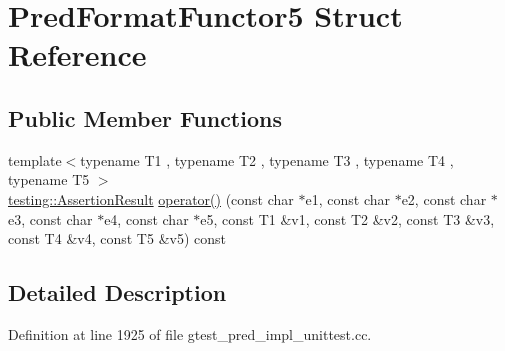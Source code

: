 \hypertarget{structPredFormatFunctor5}{\section{\-Pred\-Format\-Functor5 \-Struct \-Reference}
\label{db/d96/structPredFormatFunctor5}
}
\subsection*{\-Public \-Member \-Functions}
\begin{DoxyCompactItemize}
\item 
{\footnotesize template$<$typename T1 , typename T2 , typename T3 , typename T4 , typename T5 $>$ }\\\hyperlink{classtesting_1_1AssertionResult}{testing\-::\-Assertion\-Result} \hyperlink{structPredFormatFunctor5_abe8bc39da534f344170acebcc0356102}{operator()} (const char $\ast$e1, const char $\ast$e2, const char $\ast$e3, const char $\ast$e4, const char $\ast$e5, const \-T1 \&v1, const \-T2 \&v2, const \-T3 \&v3, const \-T4 \&v4, const \-T5 \&v5) const 
\end{DoxyCompactItemize}


\subsection{\-Detailed \-Description}


\-Definition at line 1925 of file gtest\-\_\-pred\-\_\-impl\-\_\-unittest.\-cc.



